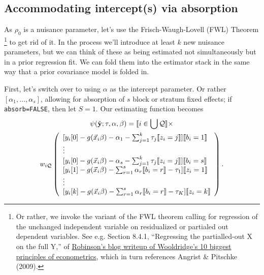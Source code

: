 \documentclass{article}
\DeclarePairedDelimiter{\indicator}{\llbracket}{\rrbracket}
\begin{document}
\subsection{Accommodating intercept(s) via absorption}\label{sec:accomm-interc-via}
As $\rho_{0}$ is a nuisance parameter, let's use the
Frisch-Waugh-Lovell (FWL) Theorem%
\footnote{Or rather, we invoke the variant of the FWL theorem calling
  for regression of the unchanged independent variable on residualized
or partialed out dependent variables.  See e.g. Section 8.4.1,
``Regressing the partialled-out X on the full Y,'' of
\href{https://bookdown.org/ts_robinson1994/10_fundamental_theorems_for_econometrics/frisch.html}{Robinson's
  blog writeup of Wooldridge's 10 biggest principles of econometrics},
which in turn references Angrist \& Pitschke (2009).} to get rid of it.  In the process we'll
introduce at least $k$ new nuisance parameters, but we can think of these as
being estimated not simultaneously but in a prior regression fit.
We can fold them into the estimator stack in the same way that a prior
covariance model is folded in.

First, let's switch over to using $\alpha$ as the intercept
parameter. Or rather $[\alpha_{1}, \ldots, \alpha_{s}]$, allowing for
absorption of $s$ block or stratum fixed effects; if
\texttt{absorb=FALSE}, then let $S=1$.    Our estimating function becomes
\begin{multline}
  \label{eq:9}
  \psi(\tilde{\mathbf{y}}; \tau, \alpha, \beta) =
  \indicator{i \in \bigcup \mathcal{Q}} \times \\
  w_{i\mathcal{Q}}
  \left(
    \begin{array}{l}
           [y_{i}[0] - g(\vec{x}_{i}\beta)-
                  \alpha_{1} -
      \sum_{j=1}^{k}\tau_{j}\indicator{z_{i}=j}]\indicator{b_{i}=1}\\
      \vdots\\ 
          {} [y_{i}[0] - g(\vec{x}_{i}\beta)-
                  \alpha_{s} -
      \sum_{j=1}^{k}\tau_{j}\indicator{z_{i}=j}]\indicator{b_{i}=s}\\      
         {}  [y_{i}[1] - g(\vec{x}_{i}\beta)-
                  \sum_{r=1}^s\alpha_r\indicator{b_i=r}-\tau_{1}]\indicator{z_{i}=1}\\
                  \vdots \\
          {} [y_{i}[k] - g(\vec{x}_{i}\beta)-
                 \sum_{r=1}^s\alpha_r\indicator{b_i=r} - \tau_{K}]\indicator{z_{i}=k}\\
    \end{array}
\right).
\end{multline}
\end{document}
